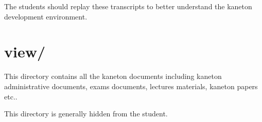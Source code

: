 The students should replay these transcripts to better understand
the kaneton development environment.

%
%

\section{view/}

This directory contains all the kaneton documents including kaneton
administrative documents, exams documents, lectures materials,
kaneton papers etc..

This directory is generally hidden from the student.
